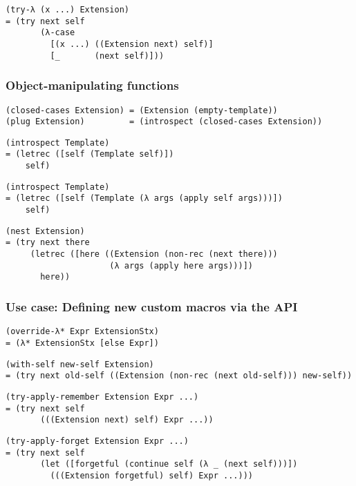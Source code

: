 \begin{verbatim}
(try-λ (x ...) Extension)
= (try next self
       (λ-case
         [(x ...) ((Extension next) self)]
         [_       (next self)]))
\end{verbatim}

\subsubsection{Object-manipulating functions}

\begin{verbatim}
(closed-cases Extension) = (Extension (empty-template))
(plug Extension)         = (introspect (closed-cases Extension))
\end{verbatim}

\begin{verbatim}
(introspect Template)
= (letrec ([self (Template self)])
    self)
\end{verbatim}

\begin{verbatim}
(introspect Template)
= (letrec ([self (Template (λ args (apply self args)))])
    self)
\end{verbatim}

\begin{verbatim}
(nest Extension)
= (try next there
     (letrec ([here ((Extension (non-rec (next there)))
                     (λ args (apply here args)))])
       here))
\end{verbatim}

\subsubsection{Use case: Defining new custom macros via the API}

\begin{verbatim}
(override-λ* Expr ExtensionStx)
= (λ* ExtensionStx [else Expr])
\end{verbatim}

\begin{verbatim}
(with-self new-self Extension)
= (try next old-self ((Extension (non-rec (next old-self))) new-self))
\end{verbatim}

\begin{verbatim}
(try-apply-remember Extension Expr ...)
= (try next self
       (((Extension next) self) Expr ...))
\end{verbatim}

\begin{verbatim}
(try-apply-forget Extension Expr ...)
= (try next self
       (let ([forgetful (continue self (λ _ (next self)))])
         (((Extension forgetful) self) Expr ...)))
\end{verbatim}



